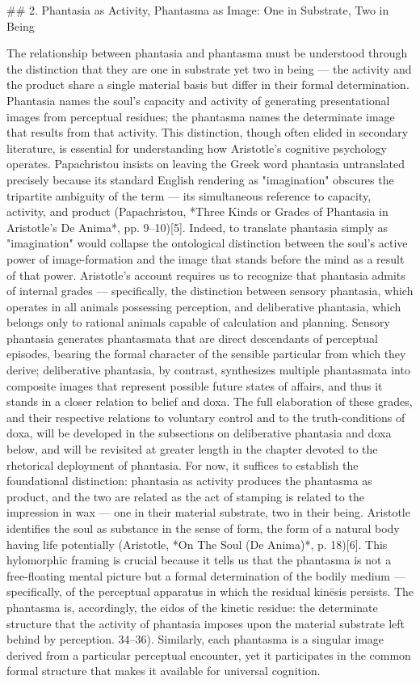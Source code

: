 ## 2. Phantasia as Activity, Phantasma as Image: One in Substrate, Two in Being

The relationship between phantasia and phantasma must be understood through the distinction that they are one in substrate yet two in being — the activity and the product share a single material basis but differ in their formal determination. Phantasia names the soul's capacity and activity of generating presentational images from perceptual residues; the phantasma names the determinate image that results from that activity. This distinction, though often elided in secondary literature, is essential for understanding how Aristotle's cognitive psychology operates. Papachristou insists on leaving the Greek word phantasia untranslated precisely because its standard English rendering as "imagination" obscures the tripartite ambiguity of the term — its simultaneous reference to capacity, activity, and product (Papachristou, *Three Kinds or Grades of Phantasia in Aristotle's De Anima*, pp. 9–10)[5]. Indeed, to translate phantasia simply as "imagination" would collapse the ontological distinction between the soul's active power of image-formation and the image that stands before the mind as a result of that power. Aristotle's account requires us to recognize that phantasia admits of internal grades — specifically, the distinction between sensory phantasia, which operates in all animals possessing perception, and deliberative phantasia, which belongs only to rational animals capable of calculation and planning. Sensory phantasia generates phantasmata that are direct descendants of perceptual episodes, bearing the formal character of the sensible particular from which they derive; deliberative phantasia, by contrast, synthesizes multiple phantasmata into composite images that represent possible future states of affairs, and thus it stands in a closer relation to belief and doxa. The full elaboration of these grades, and their respective relations to voluntary control and to the truth-conditions of doxa, will be developed in the subsections on deliberative phantasia and doxa below, and will be revisited at greater length in the chapter devoted to the rhetorical deployment of phantasia. For now, it suffices to establish the foundational distinction: phantasia as activity produces the phantasma as product, and the two are related as the act of stamping is related to the impression in wax — one in their material substrate, two in their being. Aristotle identifies the soul as substance in the sense of form, the form of a natural body having life potentially (Aristotle, *On The Soul (De Anima)*, p. 18)[6]. This hylomorphic framing is crucial because it tells us that the phantasma is not a free-floating mental picture but a formal determination of the bodily medium — specifically, of the perceptual apparatus in which the residual kinēsis persists. The phantasma is, accordingly, the eidos of the kinetic residue: the determinate structure that the activity of phantasia imposes upon the material substrate left behind by perception. 34–36). Similarly, each phantasma is a singular image derived from a particular perceptual encounter, yet it participates in the common formal structure that makes it available for universal cognition. 

